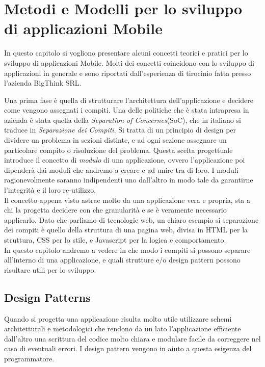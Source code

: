 \chapter{Metodi e Modelli per lo sviluppo di applicazioni Mobile}
In questo capitolo si vogliono presentare alcuni concetti teorici e pratici per lo sviluppo di applicazioni Mobile. Molti dei concetti coincidono con lo sviluppo di applicazioni in generale e sono riportati dall'esperienza di tirocinio fatta presso l'azienda BigThink SRL.

Una prima fase è quella di strutturare l'architettura dell'applicazione e decidere come vengono assegnati i compiti. Una delle politiche che è stata intrapresa in azienda è stata quella della \emph{Separation of Concernes}(SoC), che in italiano si traduce in \emph{Separazione dei Compiti}. Si tratta di un principio di design per dividere un problema in sezioni distinte, e ad ogni sezione assegnare un particolare compito o risoluzione del problema. Questa scelta progettuale introduce il concetto di \emph{modulo} di una applicazione, ovvero l'applicazione poi dipenderà dai moduli che andremo a creare e ad unire tra di loro. I moduli ragionevolmente saranno indipendenti uno dall'altro in modo tale da garantirne l'integrità e il loro re-utilizzo.\cite{wiki:soc}\\

Il concetto appena visto astrae molto da una applicazione vera e propria, sta a chi la progetta decidere con che granularità  e se è veramente necessario applicarlo. Dato che parliamo di tecnologie web, un chiaro esempio si separazione dei compiti è quello della struttura di una pagina web, divisa in HTML per la struttura, CSS per lo stile, e Javascript per la logica e comportamento.\\

In questo capitolo andremo a vedere in che modo i compiti si possono separare all'interno di una applicazione, e quali strutture e/o design pattern possono risultare utili per lo sviluppo.
 
\section{Design Patterns}

Quando si progetta una applicazione risulta molto utile utilizzare schemi architetturali e metodologici che rendono da un lato l'applicazione efficiente dall'altro una scrittura del codice molto chiara e modulare facile da correggere nel caso di eventuali errori. I design pattern vengono in aiuto a questa esigenza del programmatore.


